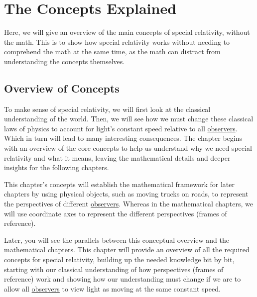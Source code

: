 \mainmatter

\part{The Concepts Explained} %

Here, we will give an overview of the main concepts of special relativity, without the math.
This is to show how special relativity works without needing to comprehend the math at the same time, as the math can distract from understanding the concepts themselves.


\chapter{Overview of Concepts} \label{ch: Conceptual Overview}

To make sense of special relativity, we will first look at the classical understanding of the world.
Then, we will see how we must change these classical laws of physics to account for light's constant speed relative to all \hyperlink{def-observer}{observers}.
Which in turn will lead to many interesting consequences.
The chapter begins with an overview of the core concepts to help us understand why we need special relativity and what it means, leaving the mathematical details and deeper insights for the following chapters.

This chapter's concepts will establish the mathematical framework for later chapters by using physical objects, such as moving trucks on roads, to represent the perspectives of different \hyperlink{def-observer}{observers}.
Whereas in the mathematical chapters, we will use coordinate axes to represent the different perspectives (frames of reference).

Later, you will see the parallels between this conceptual overview and the mathematical chapters.
This chapter will provide an overview of all the required concepts for special relativity, building up the needed knowledge bit by bit, starting with our classical understanding of how perspectives (frames of reference) work and showing how our understanding must change if we are to allow all \hyperlink{def-observer}{observers} to view light as moving at the same constant speed.

